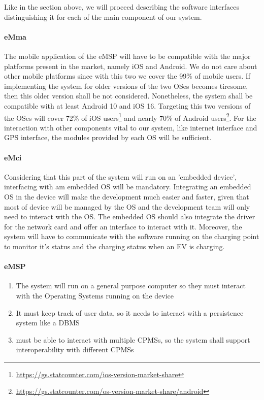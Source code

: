 Like in the section above, we will proceed describing the software interfaces distinguishing it for each of the main component of our system.

\paragraph{eMma} The mobile application of the eMSP will have to be compatible with the major platforms present in the market, namely iOS and Android. We do not care about other mobile platforms since with this two we cover the 99\% of mobile users. If implementing the system for older versions of the two OSes becomes tiresome, then this older version shall be not considered. Nonetheless, the system shall be compatible with at least Android 10 and iOS 16. Targeting this two versions of the OSes will cover 72\% of iOS users\footnote{\url{https://gs.statcounter.com/ios-version-market-share}} and nearly 70\% of Android users\footnote{\url{https://gs.statcounter.com/os-version-market-share/android}}. For the interaction with other components vital to our system, like internet interface and GPS interface, the modules provided by each OS will be sufficient.

\paragraph{eMci} Considering that this part of the system will run on an 'embedded device', interfacing with am embedded OS will be mandatory. Integrating an embedded OS in the device will make the development much easier and faster, given that most of device will be managed by the OS and the development team will only need to interact with the OS. The embedded OS should also integrate the driver for the network card and offer an interface to interact with it. Moreover, the system will have to communicate with the software running on the charging point to monitor it's status and the charging status when an EV is charging.

\paragraph{eMSP} 
\begin{enumerate}
    \item The system will run on a general purpose computer so they must interact with the Operating Systems running on the device
    \item It must keep track of user data, so it needs to interact with a persistence system like a DBMS
    \item must be able to interact with multiple CPMSs, so the system shall support interoperability with different CPMSs
\end{enumerate}

